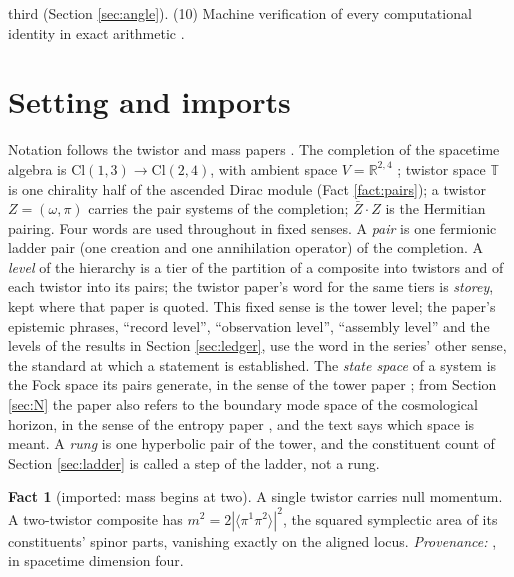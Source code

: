 \documentclass[11pt]{article}
\theoremstyle{definition}
\newtheorem{fact}[theorem]{Fact}
\newcommand{\Cl}{\mathrm{Cl}}
\newcommand{\R}{\mathbb{R}}
\newcommand{\T}{\mathbb{T}}
\newcommand{\br}[1]{\langle #1\rangle}
\begin{document}
third (Section \ref{sec:angle}). (10) Machine verification of every computational identity in exact arithmetic \cite{ButlerVerifyT12}.

\section{Setting and imports}\label{sec:setting}

Notation follows the twistor and mass papers \cite{ButlerT9, ButlerT11}. The completion of the spacetime algebra is $\Cl(1,3) \to \Cl(2,4)$, with ambient space $V = \R^{2,4}$ \cite[\S 2]{ButlerT9}; twistor space $\T$ is one chirality half of the ascended Dirac module (Fact \ref{fact:pairs}); a twistor $Z = (\omega, \pi)$ carries the pair systems of the completion; $\bar{Z} \cdot Z$ is the Hermitian pairing. Four words are used throughout in fixed senses. A \emph{pair} is one fermionic ladder pair (one creation and one annihilation operator) of the completion. A \emph{level} of the hierarchy is a tier of the partition of a composite into twistors and of each twistor into its pairs; the twistor paper's word for the same tiers is \emph{storey}, kept where that paper is quoted. This fixed sense is the tower level; the paper's epistemic phrases, ``record level'', ``observation level'', ``assembly level'' and the levels of the results in Section \ref{sec:ledger}, use the word in the series' other sense, the standard at which a statement is established. The \emph{state space} of a system is the Fock space its pairs generate, in the sense of the tower paper \cite{ButlerT3}; from Section \ref{sec:N} the paper also refers to the boundary mode space of the cosmological horizon, in the sense of the entropy paper \cite{ButlerT8}, and the text says which space is meant. A \emph{rung} is one hyperbolic pair of the tower, and the constituent count of Section \ref{sec:ladder} is called a step of the ladder, not a rung.

\begin{fact}[imported: mass begins at two]\label{fact:mass}
A single twistor carries null momentum. A two-twistor composite has $m^{2} = 2|\br{\pi^{1}\pi^{2}}|^{2}$, the squared symplectic area of its constituents' spinor parts, vanishing exactly on the aligned locus. \emph{Provenance:} \cite[Prop.~4.1]{ButlerT11}, in spacetime dimension four.
\end{fact}
\end{document}
